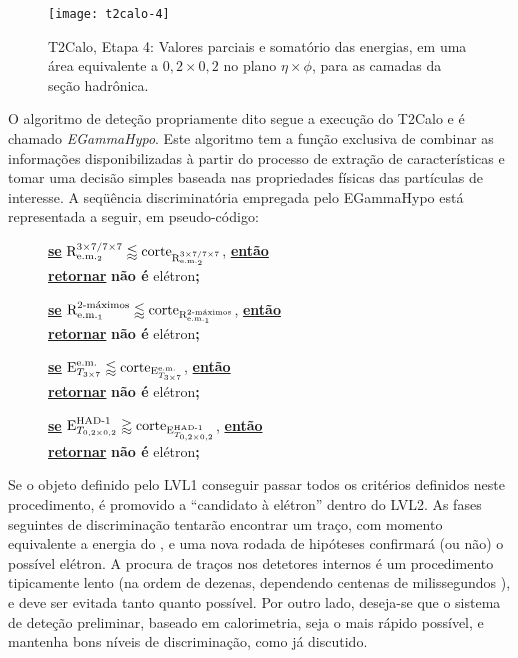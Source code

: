 \begin{enumerate}
\begin{figure}
\begin{center}
\texttt{[image: t2calo-4]}
\end{center}
\caption{T2Calo, Etapa 4: Valores parciais e somatório das energias, em uma
área equivalente a $0,2\times0,2$ no plano $\eta\times\phi$, para as camadas
da seção hadrônica.} 
\label{fig:t2calo-4}
\end{figure}

\end{enumerate}

O algoritmo de deteção propriamente dito segue a execução do T2Calo e é
chamado \emph{EGammaHypo}. Este algoritmo tem a função exclusiva de combinar
as informações disponibilizadas à partir do processo de extração de
características e tomar uma decisão simples baseada nas propriedades físicas
das partículas de interesse. A seqüência discriminatória empregada pelo
EGammaHypo está representada a seguir, em pseudo-código: 

\newcommand{\textbu}[1]{\textbf{\underline{#1}}}
\newcommand{\IF}[1]{\textbu{se} #1, \textbu{então}}
\newcommand{\RETURN}[1]{\\ \textbu{retornar} #1\textbf{;}}
\newcommand{\lumihi}{\ensuremath{10^{33} \text{cm}^{-2}\text{s}^{-1}}}

\begin{description}
\item[] \IF{$\rcore \lessapprox \text{corte}_{\rcore}$}
	\RETURN{\textbf{não é} elétron}

\item[] \IF{$\eratio \lessapprox \text{corte}_{\eratio}$}
	\RETURN{\textbf{não é} elétron}

\item[] \IF{$\etem \lessapprox \text{corte}_{\etem}$}
	\RETURN{\textbf{não é} elétron}

\item[] \IF{$\ethad \gtrapprox \text{corte}_{\ethad}$}
	\RETURN{\textbf{não é} elétron}

\end{description}

Se o objeto definido pelo LVL1 conseguir passar todos os critérios definidos
neste procedimento, é promovido a ``candidato à elétron'' dentro do LVL2. As
fases seguintes de discriminação tentarão encontrar um traço, com momento
equivalente a energia do , e uma nova rodada de hipóteses
confirmará (ou não) o possível elétron. A procura de traços nos detetores
internos é um procedimento tipicamente lento (na ordem de dezenas, dependendo
centenas de milissegundos \cite{hlt-tdr}), e deve ser evitada tanto quanto
possível. Por outro lado, deseja-se que o sistema de deteção preliminar,
baseado em calorimetria, seja o mais rápido possível, e mantenha bons níveis
de discriminação, como já discutido.


